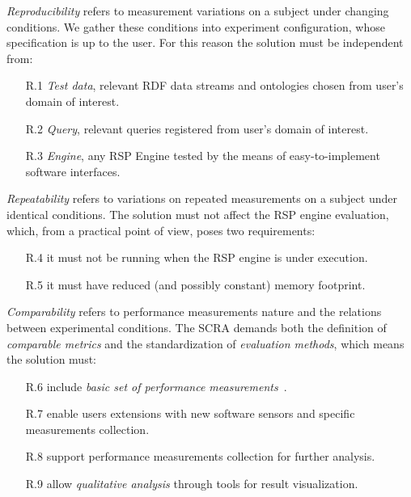 \textit{Reproducibility} refers to measurement variations on a subject under changing conditions. We gather these conditions into experiment configuration, whose specification is up to the user. For this reason the solution must be independent from:
\begin{enumerate}
\item[R.1] \textit{Test data}, relevant RDF data streams and ontologies chosen from user's domain of interest. %
\item[R.2] \textit{Query}, relevant queries registered from user's domain of interest.
\item[R.3] \textit{Engine}, any RSP Engine tested by the means of easy-to-implement software interfaces. 
\end{enumerate}

\textit{Repeatability} refers to variations on repeated measurements on a subject under identical conditions. The solution must not affect the RSP engine evaluation, which, from a practical point of view, poses two requirements:
\begin{enumerate}
\item[R.4] it must not be running when the RSP engine is under execution. %
\item[R.5] it must have reduced (and possibly constant) memory footprint. %
\end{enumerate}

\textit{Comparability} refers to performance measurements nature and the relations between experimental conditions. The SCRA demands both the definition of \textit{comparable metrics} and the standardization of \textit{evaluation methods}, which means the solution must:
\begin{enumerate}
\item[R.6] include \textit{basic set of performance measurements}~\cite{DBLP:conf/esws/ScharrenbachUMVB13}.
\item[R.7] enable users extensions with new software sensors and specific measurements collection.
\item[R.8] support performance measurements collection for further analysis.
\item[R.9] allow \textit{qualitative analysis} through tools for result visualization.
\end{enumerate}

